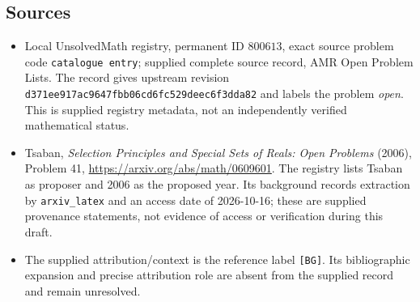 \documentclass[11pt]{article}
\begin{document}
\subsection{Sources}
\begin{itemize}
\item Local UnsolvedMath registry, permanent ID \(800613\), exact source problem code \texttt{catalogue entry}; supplied complete source record, AMR Open Problem Lists. The record gives upstream revision \texttt{d371ee917ac9647fbb06cd6fc529deec6f3dda82} and labels the problem \emph{open}. This is supplied registry metadata, not an independently verified mathematical status.
\item Tsaban, \emph{Selection Principles and Special Sets of Reals: Open Problems} (2006), Problem 41, \url{https://arxiv.org/abs/math/0609601}. The registry lists Tsaban as proposer and 2006 as the proposed year. Its background records extraction by \texttt{arxiv\_latex} and an access date of 2026-10-16; these are supplied provenance statements, not evidence of access or verification during this draft.
\item The supplied attribution/context is the reference label \texttt{[BG]}. Its bibliographic expansion and precise attribution role are absent from the supplied record and remain unresolved.
\end{itemize}
\end{document}
